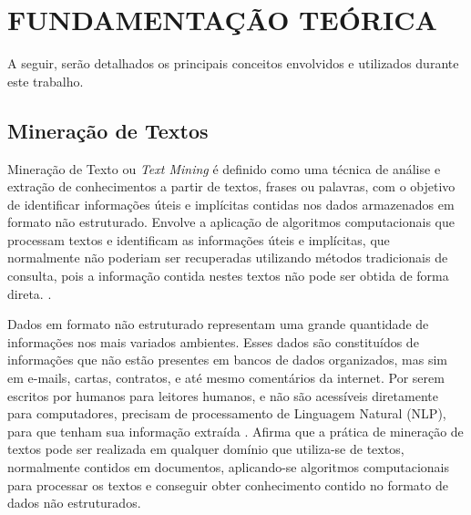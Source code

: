 \newpage
\section{FUNDAMENTAÇÃO TEÓRICA}

A seguir, serão detalhados os principais conceitos envolvidos e utilizados durante este trabalho.

\subsection{Mineração de Textos}
Mineração de Texto ou \textit{Text Mining} é definido como uma técnica de análise e extração de conhecimentos a partir de textos, frases ou palavras, com o objetivo de identificar informações úteis e implícitas contidas nos dados armazenados em formato não estruturado. Envolve a aplicação de algoritmos computacionais que processam textos e identificam as informações úteis e implícitas, que normalmente não poderiam ser recuperadas utilizando métodos tradicionais de consulta, pois a informação contida nestes textos não pode ser obtida de forma direta. \cite{morais2007mineraccao}.

Dados em formato não estruturado representam uma grande quantidade de informações nos mais variados ambientes. Esses dados são constituídos de informações que não estão presentes em bancos de dados organizados, mas sim em e-mails, cartas, contratos, e até mesmo comentários da internet. Por serem escritos por humanos para leitores humanos, e não são acessíveis diretamente para computadores, precisam de processamento de Linguagem Natural (NLP), para que tenham sua informação extraída \cite{Dorre1999TMFTextMining}.  Afirma que a prática de mineração de textos pode ser realizada em qualquer domínio que utiliza-se de textos, normalmente contidos em documentos, aplicando-se algoritmos computacionais para processar os textos e conseguir obter conhecimento contido no formato de dados não estruturados. 

